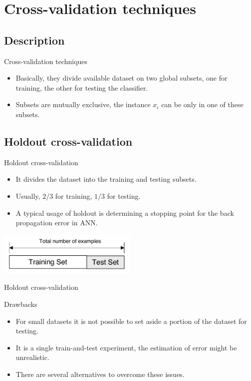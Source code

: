 \documentclass[aspectratio=169,compress,10pt]{beamer}
\begin{document}
\section{Cross-validation techniques}
\subsection{Description}
\begin{frame}{Cross-validation techniques}
\begin{itemize}
	\item Basically, they divide available dataset on two global subsets, one for training, the other for testing the classifier.
	\item Subsets are mutually exclusive, the instance $x_i$ can be only in one of these subsets.
\end{itemize}
\end{frame}

\subsection{Holdout cross-validation}
\begin{frame}{Holdout cross-validation}
\begin{itemize}
	\item It divides the dataset into the training and testing subsets.
	\item Usually, $2/3$ for training, $1/3$ for testing.
	\item A typical usage of holdout is determining a stopping point for the back propagation error in ANN.
\end{itemize}
\centering
\includegraphics[width=0.5\textwidth]{../report/resources/images/holdout}
\end{frame}

\begin{frame}{Holdout cross-validation}

{\Large{} Drawbacks} 

\begin{itemize}
	\item For small datasets it is not possible to set aside a portion of the dataset for testing.
	\item It is a single  train-and-test experiment, the estimation of error might be unrealistic.
	\item There are several alternatives to overcome these issues.
\end{itemize}
\end{frame}
\end{document}
